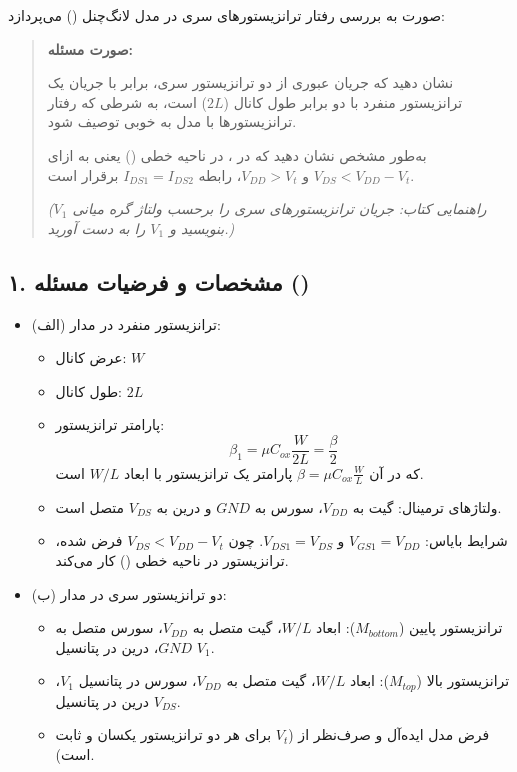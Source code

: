 صورت \textbf{} به بررسی رفتار ترانزیستورهای سری در مدل لانگ‌چنل () می‌پردازد:

\begin{quote}
\textbf{صورت مسئله:}

نشان دهید که جریان عبوری از دو ترانزیستور سری، برابر با جریان یک ترانزیستور منفرد با دو برابر طول کانال (\(2L\)) است، به شرطی که رفتار ترانزیستورها با مدل \textbf{} به خوبی توصیف شود.

به‌طور مشخص نشان دهید که در \textbf{}، در ناحیه خطی () یعنی به ازای \(V_{DS} < V_{DD} - V_t\) و \(V_{DD} > V_t\)، رابطه \(I_{DS1} = I_{DS2}\) برقرار است.

\emph{(راهنمایی کتاب: جریان ترانزیستورهای سری را برحسب ولتاژ گره میانی \(V_1\) بنویسید و \(V_1\) را به دست آورید.)}

\end{quote}

\subsection*{۱. مشخصات و فرضیات مسئله ()}
\begin{itemize}
\item ترانزیستور منفرد در مدار (الف):
\begin{itemize}
\item عرض کانال: \(W\)
\item طول کانال: \(2L\)
\item پارامتر ترانزیستور:
\[\beta_1 = \mu C_{ox} \frac{W}{2L} = \frac{\beta}{2}\]
که در آن \(\beta = \mu C_{ox} \frac{W}{L}\) پارامتر یک ترانزیستور با ابعاد \(W/L\) است.
\item ولتاژهای ترمینال: گیت به \(V_{DD}\)، سورس به \(GND\) و درین به \(V_{DS}\) متصل است.
\item شرایط بایاس: \(V_{GS1} = V_{DD}\) و \(V_{DS1} = V_{DS}\). چون \(V_{DS} < V_{DD} - V_t\) فرض شده، ترانزیستور در ناحیه خطی () کار می‌کند.

\end{itemize}
\item دو ترانزیستور سری در مدار (ب):
\begin{itemize}
\item ترانزیستور پایین (\(M_{bottom}\)): ابعاد \(W/L\)، گیت متصل به \(V_{DD}\)، سورس متصل به \(GND\)، درین در پتانسیل \(V_1\).
\item ترانزیستور بالا (\(M_{top}\)): ابعاد \(W/L\)، گیت متصل به \(V_{DD}\)، سورس در پتانسیل \(V_1\)، درین در پتانسیل \(V_{DS}\).
\item فرض مدل  ایده‌آل و صرف‌نظر از  (\(V_t\) برای هر دو ترانزیستور یکسان و ثابت است).

\end{itemize}
\end{itemize}

